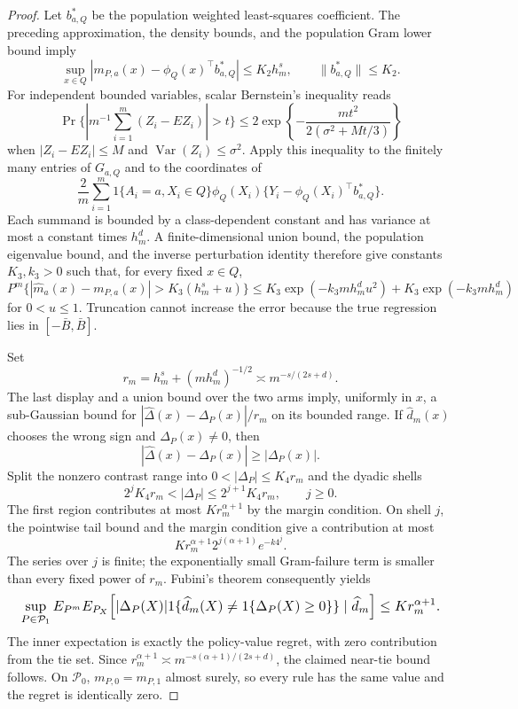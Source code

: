 \documentclass{article}
\begin{document}
\begin{proof}
Let \(b^*_{a,Q}\) be the population weighted least-squares coefficient.  The preceding approximation, the density bounds, and the population Gram lower bound imply
\[
 \sup_{x\in Q}|m_{P,a}(x)-\phi_Q(x)^\top b^*_{a,Q}|\le K_2h_m^s,
 \qquad \|b^*_{a,Q}\|\le K_2.
\]
For independent bounded variables, scalar Bernstein's inequality reads
\[
 \Pr\{|m^{-1}\textstyle\sum_{i=1}^m(Z_i-EZ_i)|>t\}
 \le2\exp\!\left\{-\frac{mt^2}{2(\sigma^2+Mt/3)}\right\}
\]
when \(|Z_i-EZ_i|\le M\) and \(\operatorname{Var}(Z_i)\le\sigma^2\).  Apply this inequality to the finitely many entries of \(G_{a,Q}\) and to the coordinates of
\[
 \frac2m\sum_{i=1}^m1\{A_i=a,X_i\in Q\}
 \phi_Q(X_i)\{Y_i-\phi_Q(X_i)^\top b^*_{a,Q}\}.
\]
Each summand is bounded by a class-dependent constant and has variance at most a constant times \(h_m^d\).  A finite-dimensional union bound, the population eigenvalue bound, and the inverse perturbation identity therefore give constants \(K_3,k_3>0\) such that, for every fixed \(x\in Q\),
\[
 P^m\{|\widehat m_a(x)-m_{P,a}(x)|>K_3(h_m^s+u)\}
 \le K_3\exp(-k_3mh_m^du^2)+K_3\exp(-k_3mh_m^d)
\]
for \(0<u\le1\).  Truncation cannot increase the error because the true regression lies in \([-\bar B,\bar B]\).

Set
\[
 r_m=h_m^s+(mh_m^d)^{-1/2}\asymp m^{-s/(2s+d)}.
\]
The last display and a union bound over the two arms imply, uniformly in \(x\), a sub-Gaussian bound for \(|\widehat\Delta(x)-\Delta_P(x)|/r_m\) on its bounded range.  If \(\widehat d_m(x)\) chooses the wrong sign and \(\Delta_P(x)\ne0\), then
\[
 |\widehat\Delta(x)-\Delta_P(x)|\ge|\Delta_P(x)|.
\]
Split the nonzero contrast range into \(0<|\Delta_P|\le K_4r_m\) and the dyadic shells
\[
 2^jK_4r_m<|\Delta_P|\le2^{j+1}K_4r_m,
 \qquad j\ge0.
\]
The first region contributes at most \(K r_m^{\alpha+1}\) by the margin condition.  On shell \(j\), the pointwise tail bound and the margin condition give a contribution at most
\[
 K r_m^{\alpha+1}2^{j(\alpha+1)}e^{-k4^j}.
\]
The series over \(j\) is finite; the exponentially small Gram-failure term is smaller than every fixed power of \(r_m\).  Fubini's theorem consequently yields
\[
\makebox[\linewidth][c]{\resizebox{0.98\linewidth}{!}{\(\displaystyle \sup_{P\in\mathcal P_1}E_{P^m}
 E_{P_X}\!\left[|\Delta_P(X)|1\{\widehat d_m(X)\ne1\{\Delta_P(X)\ge0\}\}\mid\widehat d_m\right]
 \le K r_m^{\alpha+1}.\)}}
\]
The inner expectation is exactly the policy-value regret, with zero contribution from the tie set.  Since \(r_m^{\alpha+1}\asymp m^{-s(\alpha+1)/(2s+d)}\), the claimed near-tie bound follows.  On \(\mathcal P_0\), \(m_{P,0}=m_{P,1}\) almost surely, so every rule has the same value and the regret is identically zero.
\end{proof}
\end{document}
